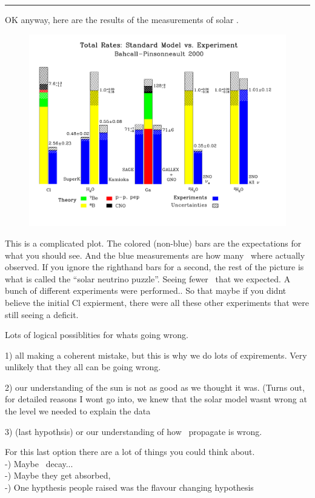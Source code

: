 {\noindent\rule{\textwidth}{1pt}

OK anyway, here are the results of the measurements of solar \nus.


\begin{figure}[h!]
\centering
\includegraphics[width=1.0\textwidth]{./SolarNuPuzzle.pdf}
\end{figure}


This is a complicated plot. 
The colored (non-blue) bars are the expectations for what you should see.
And the blue measurements are how many \nus\ where actually observed.  
If you ignore the righthand bars for a second, the rest of the picture is what is called the ``solar neutrino puzzle''. 
Seeing fewer \nus\ that we expected. 
A bunch of different experiments were performed..  
So that maybe if you didnt believe the initial Cl expierment, there were all these other experiments that were still seeing a deficit. 

Lots of logical possiblities for whats going wrong. 

1) all making a coherent mistake, but this is why we do lots of expirements.  Very unlikely that they all can be going wrong. 

2) our understanding of the sun is not as good as we thought it was.
(Turns out, for detailed reasons I wont go into, we knew  that the solar model wasnt wrong at the level we needed to explain the data

3) (last hypothsis) or our understanding of how \nus\ propagate is wrong. 

For this last option there are a lot of things you could think about. \\
 -) Maybe \nus\ decay...\\
 -) Maybe they get absorbed, \\
 -) One hypthesis people raised was the flavour changing hypothesis\\

}
